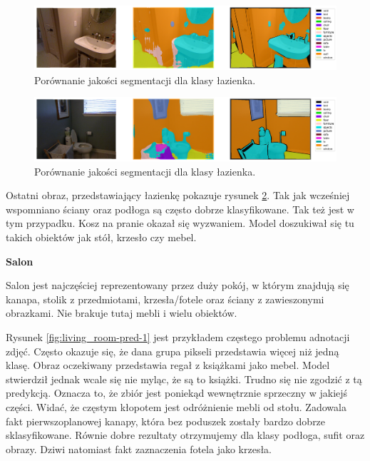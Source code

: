 \begin{figure}[ht!]
    \centering
    \includegraphics[width=\textwidth]{img/preds_analysis/gt_vs_pred/bathroom-2.png}
    \caption{Porównanie jakości segmentacji dla klasy łazienka.}
    \label{fig:bathroom-pred-2}
\end{figure}

\begin{figure}[ht!]
    \centering
    \includegraphics[width=\textwidth]{img/preds_analysis/gt_vs_pred/bathroom-3.png}
    \caption{Porównanie jakości segmentacji dla klasy łazienka.}
    \label{fig:bathroom-pred-3}
\end{figure}
Ostatni obraz, przedstawiający łazienkę pokazuje rysunek \ref{fig:bathroom-pred-3}. Tak jak wcześniej wspomniano ściany oraz podłoga są często dobrze klasyfikowane. Tak też jest w tym przypadku. Kosz na pranie okazał się wyzwaniem. Model doszukiwał się tu takich obiektów jak stół, krzesło czy mebel.


\noindent
\textbf{Salon}

Salon jest najczęściej reprezentowany przez duży pokój, w którym znajdują się kanapa, stolik z przedmiotami, krzesła/fotele oraz ściany z zawieszonymi obrazkami. Nie brakuje tutaj mebli i wielu obiektów.

Rysunek \ref{fig:living_room-pred-1} jest przykładem częstego problemu adnotacji zdjęć. Często okazuje się, że dana grupa pikseli przedstawia więcej niż jedną klasę. Obraz oczekiwany przedstawia regał z książkami jako mebel. Model stwierdził jednak wcale się nie myląc, że są to książki. Trudno się nie zgodzić z tą predykcją. Oznacza to, że zbiór jest poniekąd wewnętrznie sprzeczny w jakiejś części. Widać, że częstym kłopotem jest odróżnienie mebli od stołu. Zadowala fakt pierwszoplanowej kanapy, która bez poduszek zostały bardzo dobrze sklasyfikowane. Równie dobre rezultaty otrzymujemy dla klasy podłoga, sufit oraz obrazy. Dziwi natomiast fakt zaznaczenia fotela jako krzesła.

